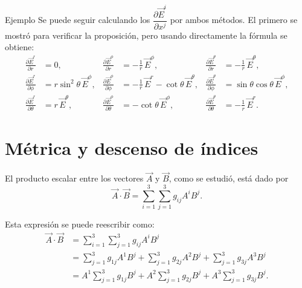 \documentclass[../apunte_mecanica_clasica.tex]{subfiles}%
\begin{document}
\begin{apuntebloque}{Ejemplo}
Se puede seguir calculando los $\dfrac{\partial \vec{E}^i}{\partial x^j}$ por ambos métodos.
El primero se mostró para verificar la proposición, pero usando directamente la fórmula se obtiene:
\begin{align*}
    \frac{\partial \vec{E}^r}{\partial r} &= 0, &
    \frac{\partial \vec{E}^\phi}{\partial r} &= -\frac{1}{r}\,\vec{E}^\phi, &
    \frac{\partial \vec{E}^\theta}{\partial r} &= -\frac{1}{r}\,\vec{E}^\theta, \\[6pt]
    \frac{\partial \vec{E}^r}{\partial \phi} &= r\sin^2\theta\,\vec{E}^\phi, &
    \frac{\partial \vec{E}^\phi}{\partial \phi} &= -\frac{1}{r}\,\vec{E}^r - \cot\theta\,\vec{E}^\theta, &
    \frac{\partial \vec{E}^\theta}{\partial \phi} &= \sin\theta\cos\theta\,\vec{E}^\phi, \\[6pt]
    \frac{\partial \vec{E}^r}{\partial \theta} &= r\,\vec{E}^\theta, &
    \frac{\partial \vec{E}^\phi}{\partial \theta} &= -\cot\theta\,\vec{E}^\phi, &
    \frac{\partial \vec{E}^\theta}{\partial \theta} &= -\frac{1}{r}\,\vec{E}^r.
\end{align*}

\end{apuntebloque}


\newpage

\section{Métrica y descenso de índices}

El producto escalar entre los vectores $\vec{A}$ y $\vec{B}$, como se estudió, 
está dado por
\begin{equation*}
    \vec{A}\cdot \vec{B} = \sum_{i=1}^3 \sum_{j=1}^3 g_{ij} A^i B^j.
\end{equation*}

Esta expresión se puede reescribir como:
\begin{align*}
    \vec{A}\cdot \vec{B} 
    &= \sum_{i=1}^3 \sum_{j=1}^3 g_{ij} A^i B^j \\[6pt]
    &= \sum_{j=1}^3 g_{1j} A^1 B^j 
      + \sum_{j=1}^3 g_{2j} A^2 B^j 
      + \sum_{j=1}^3 g_{3j} A^3 B^j \\[6pt]
    &= A^1 \sum_{j=1}^3 g_{1j} B^j 
      + A^2 \sum_{j=1}^3 g_{2j} B^j
      + A^3 \sum_{j=1}^3 g_{3j} B^j.
\end{align*}
\end{document}
